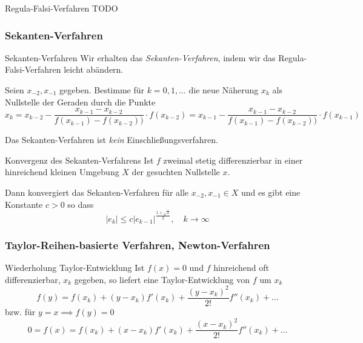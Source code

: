 \begin{example}{Regula-Falsi-Verfahren}
    TODO
\end{example}

\subsubsection{Sekanten-Verfahren}

\begin{defi}{Sekanten-Verfahren}
    Wir erhalten das \emph{Sekanten-Verfahren}, indem wir das Regula-Falsi-Verfahren leicht abändern.

    Seien $x_{-2}, x_{-1}$ gegeben.
    Bestimme für $k = 0, 1, \ldots$ die neue Näherung $x_k$ als Nullstelle der Geraden durch die Punkte
    \[
        x_k = x_{k-2} - \frac{x_{k-1} - x_{k-2}}{f(x_{k-1}) - f(x_{k-2}))} \cdot f(x_{k-2}) = x_{k-1} - \frac{x_{k-1} - x_{k-2}}{f(x_{k-1}) - f(x_{k-2}))} \cdot f(x_{k-1})
    \]

    Das Sekanten-Verfahren ist \emph{kein} Einschließungsverfahren.
\end{defi}

\begin{bonus}{Konvergenz des Sekanten-Verfahrens}
    Ist $f$ zweimal stetig differenzierbar in einer hinreichend kleinen Umgebung $X$ der gesuchten Nullstelle $x$.

    Dann konvergiert das Sekanten-Verfahren für alle $x_{-2}, x_{-1} \in X$ und es gibt eine Konstante $c > 0$ so dass
    \[
        |e_k| \leq c |e_{k-1}|^{\frac{1+\sqrt{2}}{2}}, \quad k \to \infty
    \]
\end{bonus}

\subsubsection{Taylor-Reihen-basierte Verfahren, Newton-Verfahren}

\begin{bonus}{Wiederholung Taylor-Entwicklung}
    Ist $f(x) = 0$ und $f$ hinreichend oft differenzierbar, $x_k$ gegeben, so liefert eine Taylor-Entwicklung von $f$ um $x_k$
    \[
        f(y) = f(x_k) + (y - x_k) f'(x_k) + \frac{(y - x_k)^2}{2!} f''(x_k) + \ldots
    \]
    bzw. für $y = x \implies f(y) = 0$
    \[
        0 = f(x) = f(x_k) + (x - x_k) f'(x_k) + \frac{(x - x_k)^2}{2!} f''(x_k) + \ldots
    \]
\end{bonus}


